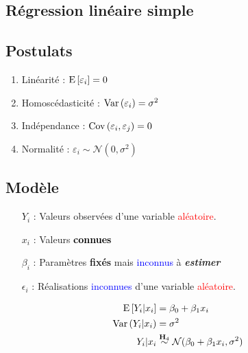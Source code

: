 \documentclass[10pt, french]{article}
\begin{document}
\begin{multicols*}{3}
\section{Régression linéaire simple}
\subsection*{Postulats}
\begin{enumerate}[label=$\mathbf{H}_{\arabic*}$]
\item Linéarité : $\mathrm{E} \left[ \varepsilon_i \right] = 0$
\item Homoscédasticité : $\mathrm{Var} \left( \varepsilon_i \right)= \sigma^2$
\item Indépendance : $\mathrm{Cov} \left( \varepsilon_i, \varepsilon_j \right) = 0$
\item Normalité : $\varepsilon_i \sim \mathcal{N} (0, \sigma^2)$
\end{enumerate}
\subsection*{Modèle}

\begin{enumerate}
	\item[$Y_i$ : ] Valeurs observées d'une variable \textcolor{red}{aléatoire}.
	\item[$x_i$ : ] Valeurs \textcolor{black}{\textbf{connues}}
	\item[$\beta_i$ : ] Paramètres \textbf{fixés} mais \textcolor{blue}{inconnus} à \textit{\textbf{estimer}}
	\item[$\epsilon_i$ : ] Réalisations \textcolor{blue}{inconnues} d'une variable \textcolor{red}{aléatoire}.
\end{enumerate}

\begin{align*}
\mathrm{E} \left[ Y_i | x_i \right] 	& = \beta_0 + \beta_1 x_i \\
\mathrm{Var} \left( Y_i | x_i \right)	& = \sigma^2 \\
Y_i | x_i & \overset{\mathbf{H}_4}{\sim} \mathcal{N} (\beta_0 + \beta_1 x_i, \sigma^2) 
\end{align*}


\end{multicols*}
\end{document}
